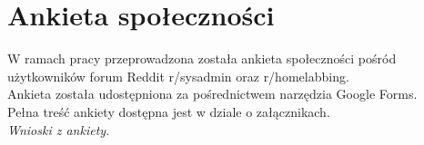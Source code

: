 \section{Ankieta społeczności}

W ramach pracy przeprowadzona została ankieta społeczności pośród użytkowników forum Reddit r/sysadmin oraz r/homelabbing.\\

Ankieta została udostępniona za pośrednictwem narzędzia Google Forms.\\Pełna treść ankiety dostępna jest w dziale o załącznikach.\\

\textit{Wnioski z ankiety.}